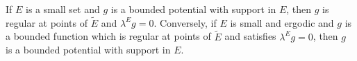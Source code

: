 If $E$ is a small set and $g$ is a bounded potential with support in $E$, then $g$ is regular at points of $\tilde{E}$ and $\lambda^E g = 0$. Conversely, if $E$ is small and ergodic and $g$ is a bounded function which is regular at points of $\tilde{E}$ and satisfies $\lambda^E g = 0$, then $g$ is a bounded potential with support in $E$.
